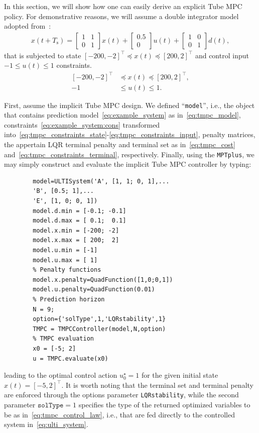 \documentclass[letterpaper, 10 pt, conference]{ieeeconf}
\begin{document}
	In this section, we will show how one can easily derive an explicit Tube MPC policy. For demonstrative reasons, we will assume a double integrator model adopted from~\cite{MS05}:
	\begin{eqnarray}
		\label{eq:example_system}
		x(t+T_\text{s}) = 
		\begin{bmatrix}
			1 & 1 \\
			0 & 1 
		\end{bmatrix} 
		x(t) + 
		\begin{bmatrix}
			0.5 \\
			0  
		\end{bmatrix}
		u(t) + 
		\begin{bmatrix}
			1 & 0 \\
			0 & 1 
		\end{bmatrix}
		d(t) ,
	\end{eqnarray}
	that is subjected to state $[-200, -2]^{\top} \preceq x(t) \preceq [200, 2]^{\top}$ and control input $-1 \leq u(t) \leq 1$ constraints.
	\begin{subequations}
		\label{eq:example_system:cons}
		\begin{align}
			[-200, -2]^{\top} &\preceq x(t) \preceq [200, 2]^{\top}, \\
			-1 &\leq u(t) \leq 1.
		\end{align}
	\end{subequations}
	
	
	
	First, assume the implicit Tube MPC design. We defined ``\verb|model|'', i.e., the object that contains prediction model~\eqref{eq:example_system} as in~\eqref{eq:tmpc_model}, constraints~\eqref{eq:example_system:cons} transformed into~\eqref{eq:tmpc_constraints_state}-\eqref{eq:tmpc_constraints_input}, penalty matrices, the appertain LQR terminal penalty and terminal set as in~\eqref{eq:tmpc_cost} and~\eqref{eq:tmpc_constraints_terminal}, respectively. 
	Finally, using the \texttt{MPTplus}, we may simply construct and evaluate the implicit Tube MPC controller by typing:
	\begin{verbatim}
		model=ULTISystem('A', [1, 1; 0, 1],...
		'B', [0.5; 1],...
		'E', [1, 0; 0, 1])
		model.d.min = [-0.1; -0.1] 
		model.d.max = [ 0.1;  0.1]
		model.x.min = [-200; -2]
		model.x.max = [ 200;  2]
		model.u.min = [-1]
		model.u.max = [ 1]
		% Penalty functions
		model.x.penalty=QuadFunction([1,0;0,1])
		model.u.penalty=QuadFunction(0.01)
		% Prediction horizon
		N = 9;
		option={'solType',1,'LQRstability',1}
		TMPC = TMPCController(model,N,option)
		% TMPC evaluation
		x0 = [-5; 2]
		u = TMPC.evaluate(x0)
	\end{verbatim}
	leading to the optimal control action $u_{0}^{\star} = 1$ for the given initial state $x(t) = [-5, 2]^\top$.
	It is worth noting that the terminal set and terminal penalty are enforced through the options parameter \texttt{LQRstability}, while the second parameter $\texttt{solType} = 1$ specifies the type of the returned optimized variables to be as in~\eqref{eq:tmpc_control_law}, i.e., that are fed directly to the controlled system in~\eqref{eq:ulti_system}.
	
\end{document}
